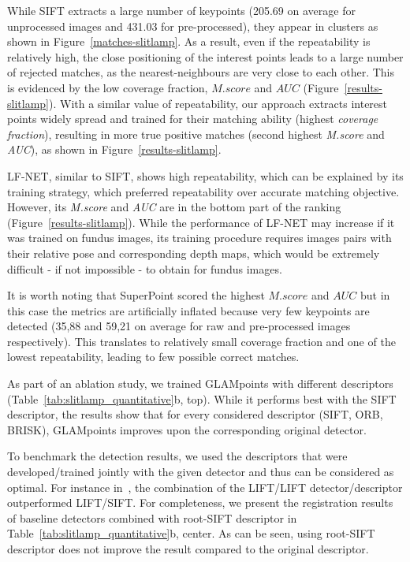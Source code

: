 



While \ac{SIFT} extracts a large number of keypoints (205.69 on average for unprocessed images and 431.03 for pre-processed), they appear in clusters as shown in Figure~\ref{matches-slitlamp}. As a result, even if the repeatability is relatively high, the close positioning of the interest points leads to a large number of rejected matches, as the nearest-neighbours are very close to each other. This is evidenced by the low coverage fraction, ${M.score}$ and ${AUC}$ (Figure~\ref{results-slitlamp}). With a similar value of repeatability, our approach extracts interest points widely spread and trained for their matching ability (highest \textit{coverage fraction}), resulting in more true positive matches (second highest \textit{M.score} and \textit{AUC}), as shown in Figure~\ref{results-slitlamp}. 

\ac{LF-NET}, similar to SIFT, shows high repeatability, which can be explained by its training strategy, which preferred repeatability over accurate matching objective. However, its \textit{M.score} and \textit{AUC} are in the bottom part of the ranking (Figure~\ref{results-slitlamp}). While the performance of \ac{LF-NET} may increase if it was trained on fundus images, its training procedure requires images pairs with their relative pose and corresponding depth maps, which would be extremely difficult - if not impossible - to obtain for fundus images. 

It is worth noting that SuperPoint scored the highest $M.score$ and $AUC$ but in this case the metrics are artificially inflated because very few keypoints are detected (35,88 and 59,21 on average for raw and pre-processed images respectively). This translates to  relatively small coverage fraction and one of the lowest repeatability, leading to few possible correct matches. 


As part of an ablation study, we trained GLAMpoints with different descriptors (Table~\ref{tab:slitlamp_quantitative}b, top). While it performs best with the SIFT descriptor, the results show that for every considered descriptor (SIFT, ORB, BRISK), GLAMpoints improves upon the corresponding original detector.

To benchmark the detection results, we used the descriptors that were developed/trained jointly with the given detector and thus can be considered as optimal. For instance in~\cite{LIFT}, the combination of the LIFT/LIFT detector/descriptor outperformed LIFT/SIFT. For completeness, we present the registration results of baseline detectors combined with root-SIFT descriptor in Table~\ref{tab:slitlamp_quantitative}b, center.  As can be seen, using root-SIFT descriptor does not improve the result compared to the original descriptor.

